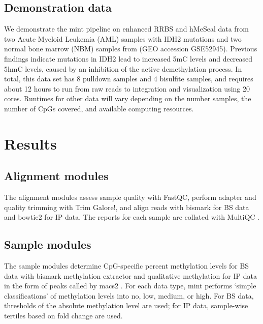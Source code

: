 \subsection{Demonstration data}
\label{mint_methods_data}

We demonstrate the mint pipeline on enhanced RRBS and hMeSeal data from two Acute Myeloid Leukemia (AML) samples with IDH2 mutations and two normal bone marrow (NBM) samples from \cite{Rampal:2014ka} (GEO accession GSE52945). Previous findings indicate mutations in IDH2 lead to increased 5mC levels and decreased 5hmC levels, caused by an inhibition of the active demethylation process. In total, this data set has 8 pulldown samples and 4 bisulfite samples, and requires about 12 hours to run from raw reads to integration and visualization using 20 cores. Runtimes for other data will vary depending on the number samples, the number of CpGs covered, and available computing resources.

\section{Results}
\label{mint_results}

\subsection{Alignment modules}
\label{mint_results_alignment}

The alignment modules assess sample quality with FastQC, perform adapter and quality trimming with Trim Galore!, and align reads with bismark \cite{Krueger:2011eb} for BS data and bowtie2 \cite{Langmead:2012jh} for IP data. The reports for each sample are collated with MultiQC \cite{Ewels:2016bk}.

\subsection{Sample modules}
\label{mint_results_sample}

The sample modules determine CpG-specific percent methylation levels for BS data with bismark methylation extractor \cite{Krueger:2011eb} and qualitative methylation for IP data in the form of peaks called by macs2 \cite{Feng:2012hi}. For each data type, mint performs ‘simple classifications' of methylation levels into no, low, medium, or high. For BS data, thresholds of the absolute methylation level are used; for IP data, sample-wise tertiles based on fold change are used.

